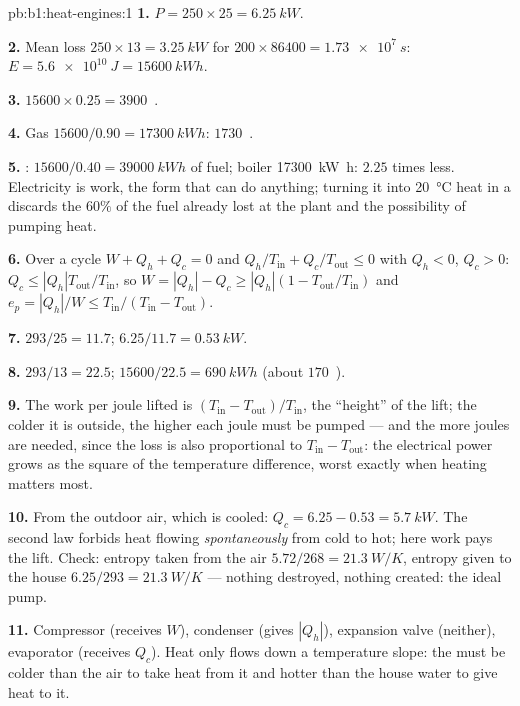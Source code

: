 \begin{solution}{pb:b1:heat-engines:1}
\textbf{1.} $P = 250 \times 25 = \qty{6.25}{kW}$.

\textbf{2.} Mean loss $250 \times 13 = \qty{3.25}{kW}$ for $200 \times 86400 =
\qty{1.73e7}{s}$: $E = \qty{5.6e10}{J} = \qty{15600}{kW h}$.

\textbf{3.} $15600 \times 0.25 = 3900$~\texteuro.

\textbf{4.} Gas $15600/0.90 = \qty{17300}{kW h}$: $1730$~\texteuro.

\textbf{5.} : $15600/0.40 = \qty{39000}{kW h}$ of fuel; boiler
\qty{17300}{kW h}: $2.25$ times less. Electricity is work, the form that can
do anything; turning it into \qty{20}{\degreeCelsius} heat in a 
discards the $60\%$ of the fuel already lost at the plant and the
possibility of pumping heat.

\textbf{6.} Over a cycle $W + Q_h + Q_c = 0$ and $Q_h/T_{\mathrm{in}} +
Q_c/T_{\mathrm{out}} \leq 0$ with $Q_h < 0$, $Q_c > 0$: $Q_c \leq
|Q_h|T_{\mathrm{out}}/T_{\mathrm{in}}$, so $W = |Q_h| - Q_c \geq |Q_h|(1 -
T_{\mathrm{out}}/T_{\mathrm{in}})$ and $e_p = |Q_h|/W \leq T_{\mathrm{in}}/(T_{\mathrm{in}} -
T_{\mathrm{out}})$.

\textbf{7.} $293/25 = 11.7$; $6.25/11.7 = \qty{0.53}{kW}$.

\textbf{8.} $293/13 = 22.5$; $15600/22.5 = \qty{690}{kW h}$ (about
$170$~\texteuro).

\textbf{9.} The work per joule lifted is $(T_{\mathrm{in}} - T_{\mathrm{out}})/
T_{\mathrm{in}}$, the ``height'' of the lift; the colder it is outside, the
higher each joule must be pumped --- and the more joules are needed, since
the loss is also proportional to $T_{\mathrm{in}} - T_{\mathrm{out}}$: the
electrical power grows as the square of the temperature difference, worst
exactly when heating matters most.

\textbf{10.} From the outdoor air, which is cooled: $Q_c = 6.25 - 0.53 =
\qty{5.7}{kW}$. The second law forbids heat flowing \emph{spontaneously}
from cold to hot; here work pays the lift. Check: entropy taken from the
air $5.72/268 = \qty{21.3}{W/K}$, entropy given to the house $6.25/293 =
\qty{21.3}{W/K}$ --- nothing destroyed, nothing created: the ideal pump.

\textbf{11.} Compressor (receives $W$), condenser (gives $|Q_h|$),
expansion valve (neither), evaporator (receives $Q_c$). Heat only flows
down a temperature slope: the  must be colder than the air to
take heat from it and hotter than the house water to give heat to it.


\end{solution}
